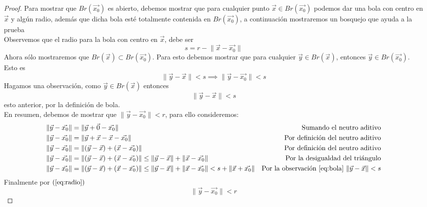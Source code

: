 \documentclass[letterpaper]{article}
\providecommand{\norm}[1]{\lVert#1\rVert}
\renewcommand{\*}{\cdot}
\theoremstyle{definition}
\begin{document}
\begin{proof}
	Para mostrar que $ Br(\vec{x_0}) $ es abierto, debemos mostrar que para cualquier punto $ \vec{x} \in Br(\vec{x_0})  $ podemos dar una bola con centro en $ \vec{x} $ y algún radio, además que dicha bola esté totalmente contenida en $ Br(\vec{x_0}) $, a continuación mostraremos un bosquejo que ayuda a la prueba\\

Observemos que el radio para la bola con centro en $ \vec{x} $, debe ser \[ s = r - \norm{\vec{x} - \vec{x_0}} \label{eq:radio} \tag{1} \]
Ahora sólo mostraremos que $ Br(\vec{x}) \subset Br(\vec{x_0}) $. Para esto debemos mostrar que para cualquier $ \vec{y} \in Br(\vec{x}) $, entonces $ \vec{y} \in Br(\vec{x_0}) $. Esto es \[ \norm{ \vec{y} - \vec{x} } < s \implies \norm{\vec{y} - \vec{x_0}} < s \] Hagamos una observación, como $ \vec{y} \in Br(\vec{x}) $ entonces \[ \norm{ \vec{y} - \vec{x} } < s \label{eq:bola} \tag{2} \] esto anterior, por la definición de bola.\\
	
	En resumen, debemos de mostrar que $ \norm{\vec{y} - \vec{x_0} } < r $, para ello consideremos:
	\begin{align*}
	\norm{\vec{y} - \vec{x_0}} &= \norm{\vec{y} + \vec{0} - \vec{x_0}} & \text{Sumando el neutro aditivo}\\
	\norm{\vec{y} - \vec{x_0}} &= \norm{\vec{y} + \vec{x} - \vec{x} - \vec{x_0}} & \text{Por definición del neutro aditivo}\\
	\norm{\vec{y} - \vec{x_0}} &= \norm{(\vec{y} - \vec{x}) + (\vec{x} - \vec{x_0})} & \text{Por definición del neutro aditivo}\\
	\norm{\vec{y} - \vec{x_0}} &= \norm{(\vec{y} - \vec{x}) + (\vec{x} - \vec{x_0})} \leq \norm{\vec{y} - \vec{x}} + \norm{ \vec{x} - \vec{x_0} } & \text{Por la desigualdad del triángulo}\\
	\norm{\vec{y} - \vec{x_0}} &= \norm{(\vec{y} - \vec{x}) + (\vec{x} - \vec{x_0})} \leq \norm{\vec{y} - \vec{x}} + \norm{ \vec{x} - \vec{x_0} } < s + \norm{\vec{x} + \vec{x_0}} & \text{Por la observación \ref{eq:bola} } \norm{ \vec{y} - \vec{x} } < s 
	\end{align*}
	Finalmente por $ (\ref{eq:radio}) $ \[ \norm{\vec{y} - \vec{x_0}}< r \]
\end{proof}
\end{document}
